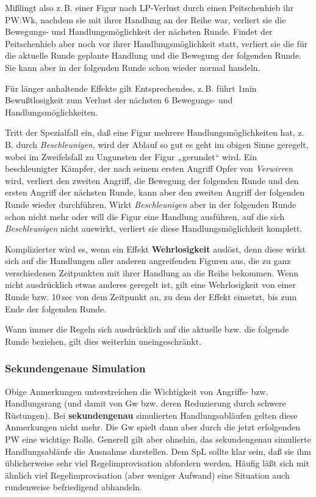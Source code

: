 \documentclass[10pt,a4paper,germanpar]{article}
\begin{document}
Mißlingt also z.\,B. einer Figur nach LP-Verlust durch einen
Peitschenhieb ihr PW:Wk, nachdem sie mit ihrer Handlung an der Reihe
war, verliert sie die Bewegungs- und Handlungsmöglichkeit der nächsten
Runde. Findet der Peitschenhieb aber noch vor ihrer
Handlungsmöglichkeit statt, verliert sie die für die aktuelle Runde
geplante Handlung und die Bewegung der folgenden Runde. Sie kann aber
in der folgenden Runde schon wieder normal handeln.

Für länger anhaltende Effekte gilt Entsprechendes, z.\,B. führt 1min
Bewußtlosigkeit zum Verlust der nächsten 6 Bewegungs- und
Handlungsmöglichkeiten.

Tritt der Spezialfall ein, daß eine Figur mehrere
Handlungsmöglichkeiten hat, z.\,B. durch \emph{Beschleunigen}, wird
der Ablauf so gut es geht im obigen Sinne geregelt, wobei im
Zweifelsfall zu Ungunsten der Figur „gerundet“ wird. Ein
beschleunigter Kämpfer, der nach seinem ersten Angriff Opfer von
\emph{Verwirren} wird, verliert den zweiten Angriff, die Bewegung der
folgenden Runde und den ersten Angriff der nächsten Runde, kann aber
den zweiten Angriff der folgenden Runde wieder durchführen. Wirkt
\emph{Beschleunigen} aber in der folgenden Runde schon nicht mehr oder
will die Figur eine Handlung ausführen, auf die sich
\emph{Beschleunigen} nicht auswirkt, verliert sie diese
Handlungsmöglichkeit komplett.

Komplizierter wird es, wenn ein Effekt \textbf{Wehrlosigkeit} auslöst,
denn diese wirkt sich auf die Handlungen aller anderen angreifenden
Figuren aus, die zu ganz verschiedenen Zeitpunkten mit ihrer Handlung
an die Reihe bekommen. Wenn nicht ausdrücklich etwas anderes geregelt
ist, gilt eine Wehrlosigkeit von einer Runde bzw. 10\,sec von dem
Zeitpunkt an, zu dem der Effekt einsetzt, bis zum Ende der folgenden
Runde.

Wann immer die Regeln sich ausdrücklich auf die aktuelle bzw. die
folgende Runde beziehen, gilt dies weiterhin uneingeschränkt.

\subsubsection{Sekundengenaue Simulation}

Obige Anmerkungen unterstreichen die Wichtigkeit von Angriffs-
bzw. Handlungsrang (und damit von Gw bzw. deren Reduzierung durch
schwere Rüstungen). Bei \textbf{sekundengenau} simulierten
Handlungsabläufen gelten diese Anmerkungen nicht mehr. Die Gw spielt
dann aber durch die jetzt erfolgenden PW eine wichtige Rolle. Generell
gilt aber ohnehin, das sekundengenau simulierte Handlungsabläufe die
Ausnahme darstellen. Dem SpL sollte klar sein, daß sie ihm
üblicherweise sehr viel Regelimprovisation abfordern werden. Häufig
läßt sich mit ähnlich viel Regelimprovisation (aber weniger Aufwand)
eine Situation auch rundenweise befriedigend abhandeln.
\end{document}
